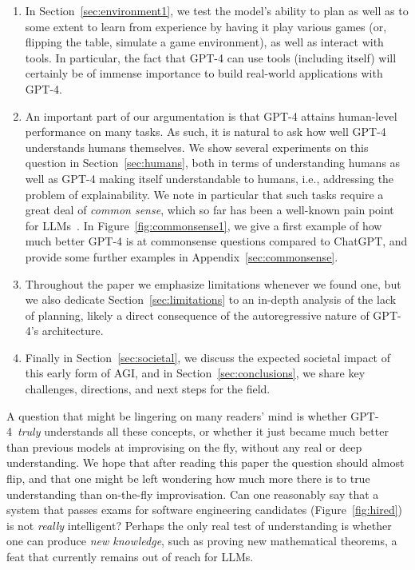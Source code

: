 \begin{enumerate}
    \item In Section~\ref{sec:environment1}, we test the model's ability to plan as well as to some extent to learn from experience by having it play various games (or, flipping the table, simulate a game environment), as well as interact with tools. In particular, the fact that {GPT-4} can use tools (including itself) will certainly be of immense importance to build real-world applications with {GPT-4}.
    \item An important part of our argumentation is that {GPT-4} attains human-level performance on many tasks. As such, it is natural to ask how well {GPT-4} understands humans themselves. We show several experiments on this question in Section~\ref{sec:humans}, both in terms of understanding humans as well as {GPT-4} making itself understandable to humans, i.e., addressing the problem of explainability. We note in particular that such tasks require a great deal of {\em common sense}, which so far has been a well-known pain point for LLMs~\cite{davis2015commonsense}. In Figure~\ref{fig:commonsense1}, we give a first example of how much better {GPT-4} is at commonsense questions compared to ChatGPT, and provide some further examples in Appendix~\ref{sec:commonsense}.
    \item Throughout the paper we emphasize limitations whenever we found one, but we also dedicate Section~\ref{sec:limitations} to an in-depth analysis of the lack of planning, likely a direct consequence of the autoregressive nature of {GPT-4}'s architecture.
    \item Finally in Section~\ref{sec:societal}, we discuss the expected societal impact of this early form of AGI, and in Section~\ref{sec:conclusions}, we share key challenges, directions, and next steps for the field.
    \end{enumerate}

    A question that might be lingering on many readers' mind is whether GPT-4\ {\em truly} understands all these concepts, or whether it just became much better than previous models at improvising on the fly, without any real or deep understanding. We hope that after reading this paper the question should almost flip, and that one might be left wondering how much more there is to true understanding than on-the-fly improvisation. Can one reasonably say that a system that passes exams for software engineering candidates (Figure~\ref{fig:hired}) is not {\em really} intelligent? Perhaps the only real test of understanding is whether one can produce {\em new knowledge}, such as proving new mathematical theorems, a feat that currently remains out of reach for LLMs.

